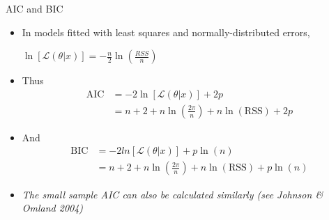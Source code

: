 \documentclass[xcolor=x11names,compress]{beamer}
\renewcommand{\(}{\begin{columns}}
\renewcommand{\)}{\end{columns}}
\newcommand{\<}[1]{\begin{column}{#1}}
\renewcommand{\>}{\end{column}}
\begin{document}

\begin{frame}{AIC and BIC}

	\begin{itemize}\itemsep6pt
		
		\item In models fitted with least squares and normally-distributed errors,
		
		 $\ln[\mathcal{L}(\theta |x)] = -\frac{n}{2}\ln\left(\frac{RSS}{n}\right)$

		\item Thus 
		\begin{align*}
			\text{AIC} &= -2 \ln[\mathcal{L}(\theta |x)] + 2p \\
			&= n + 2 + n \ln\left(\frac{2 \pi}{n}\right) + n \ln(\text{RSS}) + 2 p			
		\end{align*}
		
		\item And 
		\begin{align*}
			\text{BIC} &= -2 ln[\mathcal{L}(\theta |x) ] + p \ln(n) \\ 
			&= n + 2 + n \ln\left(\frac{2 \pi}{n}\right) + n \ln(\text{RSS}) + p \ln(n)
		\end{align*}

		\item  \it The small sample AIC can also be calculated similarly (see Johnson \& Omland 2004)

	\end{itemize}
	
	\end{frame}

\end{document}
